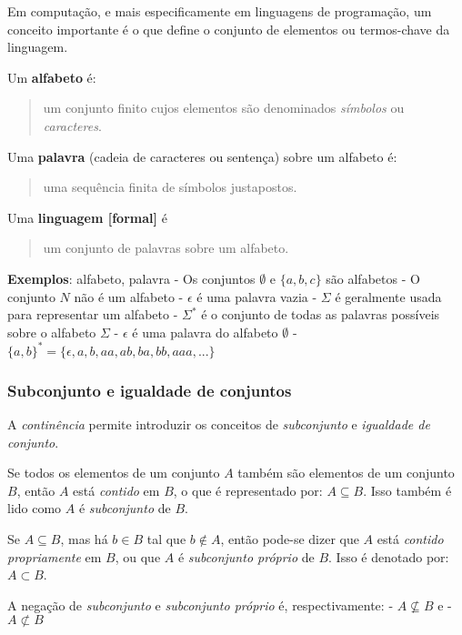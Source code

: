 \documentclass{article}
\begin{document}
    Em computação, e mais especificamente em linguagens de programação, um
conceito importante é o que define o conjunto de elementos ou
termos-chave da linguagem.

Um \textbf{alfabeto} é:

\begin{quote}
um conjunto finito cujos elementos são denominados \emph{símbolos} ou
\emph{caracteres}.
\end{quote}

Uma \textbf{palavra} (cadeia de caracteres ou sentença) sobre um
alfabeto é:

\begin{quote}
uma sequência finita de símbolos justapostos.
\end{quote}

Uma \textbf{linguagem {[}formal{]}} é

\begin{quote}
um conjunto de palavras sobre um alfabeto.
\end{quote}

\textbf{Exemplos}: alfabeto, palavra - Os conjuntos \(\emptyset\) e
\(\{a, b, c\}\) são alfabetos - O conjunto \(N\) não é um alfabeto -
\(\epsilon\) é uma palavra vazia - \(\Sigma\) é geralmente usada para
representar um alfabeto - \(\Sigma^*\) é o conjunto de todas as palavras
possíveis sobre o alfabeto \(\Sigma\) - \(\epsilon\) é uma palavra do
alfabeto \(\emptyset\) -
\(\{a, b\}^* = \{\epsilon, a, b, aa, ab, ba, bb, aaa, ...\}\)


    \subsubsection{Subconjunto e igualdade de conjuntos}


    A \emph{continência} permite introduzir os conceitos de
\emph{subconjunto} e \emph{igualdade de conjunto}.

Se todos os elementos de um conjunto \(A\) também são elementos de um
conjunto \(B\), então \(A\) está \emph{contido} em \(B\), o que é
representado por: \(A \subseteq B\). Isso também é lido como \(A\) é
\emph{subconjunto} de \(B\).

Se \(A \subseteq B\), mas há \(b \in B\) tal que \(b \not\in A\), então
pode-se dizer que \(A\) está \emph{contido propriamente} em \(B\), ou
que \(A\) é \emph{subconjunto próprio} de \(B\). Isso é denotado por:
\(A \subset B\).

A negação de \emph{subconjunto} e \emph{subconjunto próprio} é,
respectivamente: - \(A \not\subseteq B\) e - \(A \not\subset B\)
\end{document}
